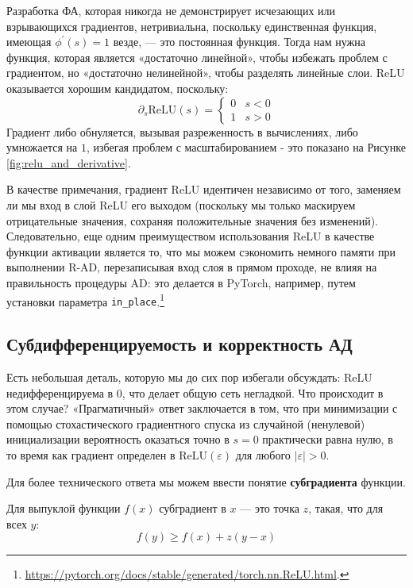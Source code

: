Разработка ФА, которая никогда не демонстрирует исчезающих или взрывающихся градиентов, нетривиальна, поскольку единственная функция, имеющая $\phi^\prime(s)=1$ везде, — это постоянная функция. Тогда нам нужна функция, которая является «достаточно линейной», чтобы избежать проблем с градиентом, но «достаточно нелинейной», чтобы разделять линейные слои. ReLU оказывается хорошим кандидатом, поскольку:
%
$$\partial_s \text{ReLU}(s)=\begin{cases} 0 & s < 0 \\ 1 & s >0 \end{cases}$$
%
Градиент либо обнуляется, вызывая разреженность в вычислениях, либо умножается на $1$, избегая проблем с масштабированием - это показано на Рисунке \ref{fig:relu_and_derivative}.

В качестве примечания, градиент ReLU идентичен независимо от того, заменяем ли мы вход в слой ReLU его выходом (поскольку мы только маскируем отрицательные значения, сохраняя положительные значения без изменений). Следовательно, еще одним преимуществом использования ReLU в качестве функции активации является то, что мы можем сэкономить немного памяти при выполнении R-AD, перезаписывая вход слоя в прямом проходе, не влияя на правильность процедуры AD: это делается в PyTorch, например, путем установки параметра {\footnotesize\verb+in_place+}.\footnote{\url{https://pytorch.org/docs/stable/generated/torch.nn.ReLU.html}.}

\subsection{Субдифференцируемость и корректность АД}
\label{subsec:subdifferentiability}

\addteacup Есть небольшая деталь, которую мы до сих пор избегали обсуждать: ReLU недифференцируема в $0$, что делает общую сеть негладкой. Что происходит в этом случае? «Прагматичный» ответ заключается в том, что при минимизации с помощью стохастического градиентного спуска из случайной (ненулевой) инициализации вероятность оказаться точно в $s=0$ практически равна нулю, в то время как градиент определен в $\text{ReLU}(\varepsilon)$ для любого $\lvert\varepsilon\rvert>0$.

Для более технического ответа мы можем ввести понятие \textbf{субградиента} функции.

\begin{definition}[Субградиент]
%
Для выпуклой функции $f(x)$ субградиент в $x$ — это точка $z$, такая, что для всех $y$:
%
$$
f(y) \ge f(x)+z(y-x)
$$
%
\end{definition}

